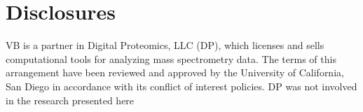 \documentclass{bioinfo}
\begin{document}
\section*{Disclosures}
VB is a partner in Digital Proteomics, LLC (DP), which licenses and sells computational tools for analyzing mass spectrometry data. The terms of this arrangement have been reviewed and approved by the University of California, San Diego in accordance with its conflict of interest policies. DP was not involved in the research presented here
%
%
%
%
%
%
%
%
%



\end{document}
